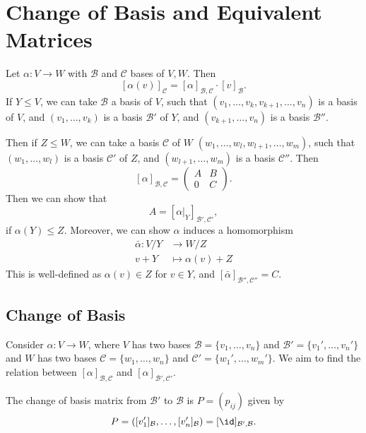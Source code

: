 \documentclass[12pt]{article}
\begin{document}
\newpage

\section{Change of Basis and Equivalent Matrices}%
\label{sec:change_of_basis_and_equivalent_matrices}

Let $\alpha : V \to W$ with $\mathcal{B}$ and $\mathcal{C}$ bases of $V, W$. Then
\[
	[\alpha(v)]_{\mathcal{C}} = [\alpha]_{\mathcal{B}, \mathcal{C}} \cdot [v]_{\mathcal{B}}
.\]
If $Y \leq V$, we can take $\mathcal{B}$ a basis of $V$, such that $(v_1, \ldots, v_k, v_{k+1}, \ldots, v_n)$ is a basis of $V$, and $(v_1, \ldots, v_k)$ is a basis $\mathcal{B}'$ of $Y$, and $(v_{k+1}, \ldots, v_n)$ is a basis $\mathcal{B}''$.

Then if $Z \leq W$, we can take a basis $\mathcal{C}$ of $W$ $(w_1, \ldots, w_l, w_{l+1}, \ldots, w_m)$, such that $(w_1, \ldots, w_l)$ is a basis $\mathcal{C}'$ of $Z$, and $(w_{l+1}, \ldots, w_m)$ is a basis $\mathcal{C}''$. Then
\[
	[\alpha]_{\mathcal{B}, \mathcal{C}} =
	\begin{pmatrix}
		A & B \\
		0 & C
	\end{pmatrix}
.\]
Then we can show that
\[
	A = [\alpha|_{Y}]_{\mathcal{B}', \mathcal{C}'}
,\]
if $\alpha(Y) \leq Z$. Moreover, we can show $\alpha$ induces a homomorphism
\begin{align*}
	\bar \alpha : V / Y &\to W / Z \\
	v + Y &\mapsto \alpha(v) + Z
\end{align*}
This is well-defined as $\alpha(v) \in Z$ for $v \in Y$, and $[\bar \alpha]_{\mathcal{B}'', \mathcal{C}''} = C$.

\subsection{Change of Basis}%
\label{sub:change_of_basis}

Consider $\alpha : V \to W$, where $V$ has two bases $\mathcal{B} = \{v_1, \ldots, v_n\}$ and $\mathcal{B}' = \{v_1', \ldots, v_n'\}$ and $W$ has two bases $\mathcal{C} = \{w_1, \ldots, w_n\}$ and $\mathcal{C}' = \{w_1', \ldots, w_m'\}$. We aim to find the relation between $[\alpha]_{\mathcal{B}, \mathcal{C}}$ and $[\alpha]_{\mathcal{B}', \mathcal{C}'}$.

\begin{definition}
	The change of basis matrix from $\mathcal{B}'$ to $\mathcal{B}$ is $P = (p_{ij})$ given by
	\[
		P = ([v_1']_{\mathcal{B}}, \ldots, [v_n']_{\mathcal{B}}) = [\id]_{\mathcal{B}', \mathcal{B}}
	.\]
\end{definition}
\end{document}
